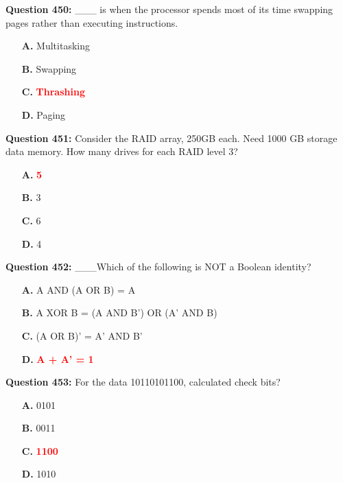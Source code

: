 \documentclass[12pt,a4paper]{article}
\begin{document}
\vspace{0.5cm}

\textbf{Question 450:} ___ is when the processor spends most of its time swapping pages rather than executing instructions.

\begin{itemize}
    \item[\textbf{A.}] Multitasking
    \item[\textbf{B.}] Swapping
    \item[\textbf{C.}] \textcolor{red}{\textbf{Thrashing}}
    \item[\textbf{D.}] Paging
\end{itemize}

\vspace{0.5cm}

\textbf{Question 451:} Consider the RAID array, 250GB each. Need 1000 GB storage data memory. How many drives for each RAID level 3?

\begin{itemize}
    \item[\textbf{A.}] \textcolor{red}{\textbf{5}}
    \item[\textbf{B.}] 3
    \item[\textbf{C.}] 6
    \item[\textbf{D.}] 4
\end{itemize}

\vspace{0.5cm}

\textbf{Question 452:} ___Which of the following is NOT a Boolean identity?

\begin{itemize}
    \item[\textbf{A.}] A AND (A OR B) = A
    \item[\textbf{B.}] A XOR B = (A AND B') OR (A' AND B)
    \item[\textbf{C.}] (A OR B)' = A' AND B'
    \item[\textbf{D.}] \textcolor{red}{\textbf{A + A' = 1}}
\end{itemize}

\vspace{0.5cm}

\textbf{Question 453:} For the data 10110101100, calculated check bits?

\begin{itemize}
    \item[\textbf{A.}] 0101
    \item[\textbf{B.}] 0011
    \item[\textbf{C.}] \textcolor{red}{\textbf{1100}}
    \item[\textbf{D.}] 1010
\end{itemize}
\end{document}
